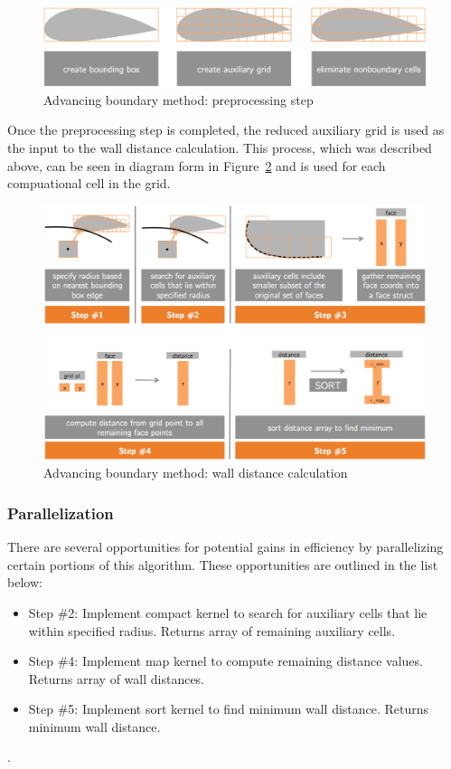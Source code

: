 \documentclass[]{aiaa-tc}%
\begin{document}
\begin{figure}
  \includegraphics{figures/preprocessor/preprocessor_diagram}
  \caption{Advancing boundary method: preprocessing step}
  \label{f:ab_preprocessor_diagram}
\end{figure}


Once the preprocessing step is completed, the reduced auxiliary grid
is used as the input to the wall distance calculation. This process,
which was described above, can be seen in diagram form in
Figure~\ref{f:ab_diagram} and is used for each compuational cell in
the grid.


\begin{figure}
  \centering
  \includegraphics[width=0.95\linewidth]{figures/auxiliary_grid/algorithm_diagram}
\caption{Advancing boundary method: wall distance calculation}
\label{f:ab_diagram}
\end{figure}

\subsubsection{Parallelization}
There are several opportunities for potential gains in efficiency by
parallelizing certain portions of this algorithm. These opportunities
are outlined in the list below:

\begin{itemize}
\item Step \#2: Implement compact kernel to search for auxiliary cells
  that lie within specified radius. Returns array of remaining
  auxiliary cells.
  
\item Step \#4: Implement map kernel to compute remaining distance
  values. Returns array of wall distances.
  
\item Step \#5: Implement sort kernel to find minimum wall
  distance. Returns minimum wall distance.
\end{itemize}.
\end{document}
